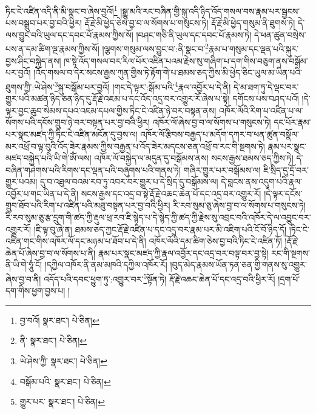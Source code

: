 ཏིང་ངེ་འཛིན་འདི་ནི་མི་སྣང་བ་ཞེས་བྱའོ།\footnote{བྱ་བའོ།  སྣར་ཐང་།  པེ་ཅིན། } །སྒྱུ་མའི་རང་བཞིན་གྱི་སྐུ་འདི་ཉིད་འོད་གསལ་བས་རྣམ་པར་སྦྱངས་པས་བསྒྲུབ་པར་བྱ་བའི་ཕྱིར། རྡོ་རྗེ་མི་ཕྱེད་ཅེས་བྱ་བ་ལ་སོགས་པ་གསུངས་ཏེ། རྡོ་རྗེ་མི་ཕྱེད་གསུམ་ནི་ཐུགས་ཏེ། དེ་ལས་བྱུང་བའི་ཡུལ་དང་དབང་པོ་རྣམས་ཀྱིས་སོ། །བཤང་གཅི་ནི་ཡུལ་དང་དབང་པོ་རྣམས་ཏེ། དེ་ཕན་ཚུན་བསྲེས་པས་ན་དམ་ཚིག་ལྔ་རྣམས་ཀྱིས་སོ། །ལྕགས་གསུམ་ལས་བྱུང་བ་:ནི་སྣང་བ་\footnote{ནི་  སྣར་ཐང་།  པེ་ཅིན། }རྣམ་པ་གསུམ་དང་ལྡན་པའི་སྐུར་བྱས་ཤིང་བསྐྱེད་ནས། ཁ་སྟེ་འོད་གསལ་བར་རིལ་པོར་འཛིན་པའམ་རྗེས་སུ་གཞིག་པ་དག་གིས་བཅུག་ནས་བསྒོམ་པར་བྱའོ། །འོད་གསལ་བ་དེར་སངས་རྒྱས་ཀུན་གྱིས་ཏེ་རྟོག་གེ་པ་ཐམས་ཅད་ཀྱིས་མི་ཕྱེད་ཅིང་ཡུལ་མ་ཡིན་པའི་ཐུགས་ཀྱི་:ཡེ་ཤེས་\footnote{ཡེ་ཤེས་ཀྱི་  སྣར་ཐང་།  པེ་ཅིན། }སྐུ་བསྒོམ་པར་བྱའོ། །གང་དེ་ལྟར་:སྒོམ་པའི་\footnote{བསྒོམ་པའི་  སྣར་ཐང་།  པེ་ཅིན། }རྣལ་འབྱོར་པ་དེ་ནི། དེ་མ་ཐག་ཏུ་དེ་ལྡང་བར་གྱུར་པའི་མཚན་ཉིད་ཅན་ཉིད་དུ་རྡོ་རྗེ་འཇམ་པ་དང་འོད་འདྲ་བར་འགྱུར་རོ་ཞེས་པ་སྟེ། དགོངས་པས་བཤད་པའོ། །དེ་ལྟར་བྱང་ཆུབ་སེམས་དཔའ་འཇམ་དཔལ་གྱིས་ཏིང་ངེ་འཛིན་ཉེ་བར་བསྟན་ནས། འཁོར་ལོའི་རིག་པ་འཛིན་པ་ལ་སོགས་པའི་དངོས་གྲུབ་ཉེ་བར་བསྟན་པར་བྱ་བའི་ཕྱིར། འཁོར་ལོ་ཞེས་བྱ་བ་ལ་སོགས་པ་གསུངས་ཏེ། དང་པོར་རྣམ་པར་སྣང་མཛད་ཀྱི་ཏིང་ངེ་འཛིན་མངོན་དུ་བྱས་ལ། འཁོར་ལོ་རྩིབས་བརྒྱད་པ་མདོག་དཀར་བ་ཕན་ཚུན་བསྣོལ་མར་འཕྲོ་བ་ལྟ་བུའི་འོད་ཟེར་རྣམས་ཀྱིས་བརྒྱན་པ་འོད་ཟེར་མདངས་ཅན་འཕྲོ་བ་རང་གི་སྔགས་ཏེ། རྣམ་པར་སྣང་མཛད་བསྐྱེད་པའི་ཡི་གེ་ཨོཾ་ལས། འཁོར་ལོ་བསྐྱེད་ལ་མདུན་དུ་བསྒོམས་ནས། སངས་རྒྱས་ཐམས་ཅད་ཀྱིས་ཏེ། དེ་བཞིན་གཤེགས་པའི་རིགས་དང་ལྡན་པའི་བཞུགས་པའི་གནས་ཏེ། གཞིར་གྱུར་པར་བསྒོམས་ལ། ཇི་སྲིད་དུ་དྲོ་བར་གྱུར་པའམ། དུ་བ་འཐུལ་བའམ་རབ་ཏུ་འབར་བར་གྱུར་པ་དེ་སྲིད་དུ་བསྒོམས་ལ། དེ་བླངས་ནས་འདུག་པའི་རྣལ་འབྱོར་པ་གང་ཡིན་པ་དེ་ནི། སངས་རྒྱས་དང་འདྲ་བ་སྟེ་རྡོ་རྗེ་འཆང་ཆེན་པོ་དང་འདྲ་བར་འགྱུར་རོ། །དེ་ལྟར་དངོས་གྲུབ་ཐོབ་པའི་རིག་པ་འཛིན་པའི་མཐུ་བསྟན་པར་བྱ་བའི་ཕྱིར། རི་རབ་སུམ་ཅུ་ཞེས་བྱ་བ་ལ་སོགས་པ་གསུངས་ཏེ། རི་རབ་སུམ་ཅུ་རྩ་དྲུག་གི་ཚད་ཀྱི་རྡུལ་ཕྲ་རབ་ཇི་སྙེད་པ་དེ་སྙེད་ཀྱི་ཚད་ཀྱི་རྗེས་སུ་འབྲང་བའི་འཁོར་དེ་ལ་འབྱུང་བར་འགྱུར་རོ། །ཇི་ལྟ་བུ་ཞེ་ན། ཐམས་ཅད་ཀྱང་རྡོ་རྗེ་འཛིན་པ་དང་འདྲ་བར་རྣམ་པར་མི་འཇིག་པའི་ངོ་བོ་ཉིད་དོ། །ཏིང་ངེ་འཛིན་གང་གིས་འཁོར་ལོ་དང་མཉམ་པ་ཐོབ་པ་དེ་ནི། འཁོར་ལོའི་དམ་ཚིག་ཅེས་བྱ་བའི་ཏིང་ངེ་འཛིན་ཏོ། །རྡོ་རྗེ་ཆེན་པོ་ཞེས་བྱ་བ་ལ་སོགས་པ་ནི། རྣམ་པར་སྣང་མཛད་ཀྱི་རྣལ་འབྱོར་དང་འདྲ་བར་བལྟ་བར་བྱ་སྟེ། རང་གི་སྔགས་ནི་ཡི་གེ་ཧཱུཾ་ངོ། །དཀྱིལ་འཁོར་ནི་ནམ་མཁའི་དཀྱིལ་འཁོར་རོ། །བུད་མེད་རྣམས་ཡོན་ཏན་ཅན་གྱི་གནས་སུ་འགྱུར་ཞེས་བྱ་བ་ནི། འདོད་པའི་དབང་ཕྱུག་ཏུ་:འགྱུར་བར་\footnote{གྱུར་པར་  སྣར་ཐང་།  པེ་ཅིན། }སྟོན་ཏེ། རྡོ་རྗེ་འཆང་ཆེན་པོ་དང་འདྲ་བའི་ཕྱིར་རོ། །དྲག་པོ་དག་གིས་ཕྱག་བྱས་པ། །
